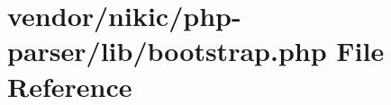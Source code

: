 \section{vendor/nikic/php-\/parser/lib/bootstrap.php File Reference}
\label{nikic_2php-parser_2lib_2bootstrap_8php}

